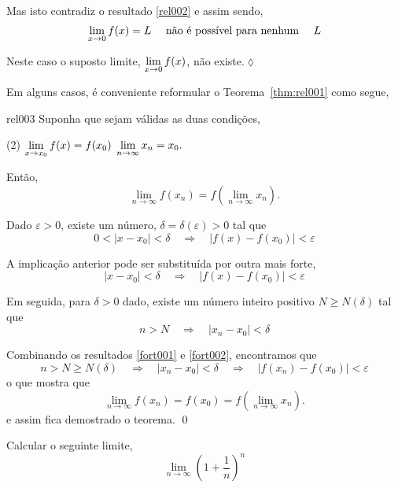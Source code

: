 Mas isto contradiz o resultado \eqref{rel002} e assim sendo,
\begin{equation*}
    \lim_{x\to 0}f(x)=L\quad\text{ n\~{a}o \'{e} poss\'{\i}vel para nenhum }\quad  L
\end{equation*}

Neste caso o suposto limite, $\displaystyle{ \lim_{x\to 0}f(x)}$,  n\~{a}o existe.\hfill \(\lozenge\)

Em alguns casos, \'{e} conveniente reformular o Teorema~\ref{thm:rel001} como segue,
\begin{theoc}{}{rel003}
Suponha que sejam v\'{a}lidas as duas condi\c{c}\~{o}es,
\begin{tasks}[label=\rm{(\alph*)},item-indent=4em,label-width=4ex,ref=\rm{(\alph*)}](2)
 \task  \(\displaystyle \lim_{x\to x_0}f(x)=f(x_0)\)
 \task  \(\displaystyle \lim_{n\to \infty} x_n=x_0.\)
\end{tasks}

Ent\~{a}o,
\begin{equation*}
    \lim_{n\to \infty}f(x_n)=f\left(\lim_{n\to \infty}x_n\right).
\end{equation*}
\end{theoc}

\prova Dado $\varepsilon>0$, existe um n\'{u}mero, $\delta=\delta(\varepsilon)>0$ tal que
\begin{equation*}
    0<|x-x_0|<\delta\quad \Rightarrow \quad |f(x)-f(x_0)|<\varepsilon
\end{equation*}

A implica\c{c}\~{a}o anterior pode ser substituída por outra mais forte,
\begin{equation}\label{fort001}
   |x-x_0|<\delta\quad \Rightarrow \quad |f(x)-f(x_0)|<\varepsilon
\end{equation}

Em seguida, para $\delta>0$ dado, existe um n\'{u}mero inteiro positivo $N \geq N(\delta)$ tal que
\begin{equation}\label{fort002}
    n>N\quad \Rightarrow \quad |x_n-x_0 |<\delta
\end{equation}

Combinando os resultados \eqref{fort001} e \eqref{fort002}, encontramos que
\begin{equation*}
    n>N \geq N(\delta)\quad \Rightarrow \quad |x_n-x_0|<\delta\quad \Rightarrow \quad |f(x_n)-f(x_0)|<\varepsilon
\end{equation*}
o que mostra que
\begin{equation*}
    \lim_{n\to \infty}f(x_n)=f(x_0)=f\left(\lim_{n\to \infty}x_n\right).
\end{equation*}
e assim fica demostrado o teorema. \qed
\begin{exer}
Calcular o seguinte limite,
\begin{equation*}
    \lim_{n\to \infty}\left(1+\dfrac{1}{n} \right)^n
\end{equation*}

\end{exer}

